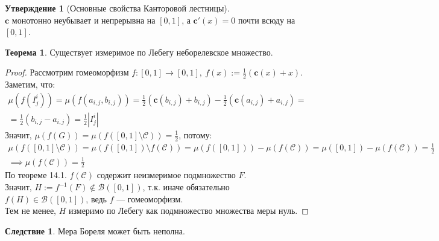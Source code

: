 \documentclass[11pt,a4paper]{report}
\def\borel{\mathcal{B}}
\def\cantor{\mathcal{C}}
\theoremstyle{definition}
\theoremstyle{definition}
\newtheorem{theorem}{Теорема}[section]
\newtheorem{preposition}{Утверждение}[section]
\newtheorem{corollary}{Следствие}[section]
\theoremstyle{definition}
\begin{document}
	\begin{preposition}[Основные свойства Канторовой лестницы]$  $\\
		$ \mathbf{c} $ монотонно неубывает и непрерывна на $ [0, 1] $, а $ \mathbf{c}'(x) = 0 $ почти всюду на $ [0, 1] $.
	\end{preposition}
	\begin{theorem}
		Существует измеримое по Лебегу неборелевское множество.
	\end{theorem}
	\begin{proof}
		Рассмотрим гомеоморфизм $ f: [0, 1] \to [0, 1],\ f(x) := \frac{1}{2}(\mathbf{c}(x) + x) $.\\
		Заметим, что: 
		\begin{gather*} 
			\mu(f(I^{i}_{j})) = \mu(f(a_{i, j}, b_{i, j})) = \frac{1}{2}(\mathbf{c}(b_{i, j}) + b_{i, j}) - \frac{1}{2}(\mathbf{c}(a_{i, j}) +  a_{i, j}) =\\= \frac{1}{2}(b_{i,  j} - a_{i, j}) = \frac{1}{2} |I^{i}_{j}| 
		\end{gather*}
		Значит, $ \mu(f(G)) = \mu(f([0, 1] \setminus \cantor)) = \frac{1}{2} $, потому: 
		\begin{gather*} 
			\mu(f([0, 1] \setminus \cantor)) = \mu(f([0, 1]) \setminus f(\cantor)) = \mu(f([0, 1])) - \mu(f(\cantor)) = \mu([0, 1]) - \mu(f(\cantor)) = \frac{1}{2}\\
			\implies  \mu(f(\cantor)) = \frac{1}{2} 
		\end{gather*}
		По теореме 14.1. $ f(\cantor) $ содержит неизмеримое подмножество $ F $.\\
		Значит, $ H := f^{-1}(F) \not \in \borel([0, 1]) $, т.к. иначе обязательно $ f(H) \in \borel([0, 1]) $, ведь $ f $ — гомеоморфизм.\\
		Тем не менее, $ H $ измеримо по Лебегу как подмножество множества меры нуль.
	\end{proof}
	\begin{corollary}
		Мера Бореля может быть неполна.
	\end{corollary}
\end{document}
